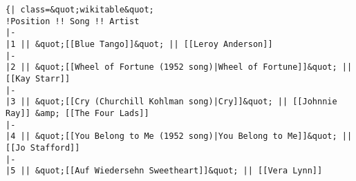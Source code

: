 
\begin{lstlisting}[caption=Auszug eines Wikipedia-Artikel Downloads, label=lst:wikiExcerpt]
{| class=&quot;wikitable&quot;
!Position !! Song !! Artist
|-
|1 || &quot;[[Blue Tango]]&quot; || [[Leroy Anderson]]
|-
|2 || &quot;[[Wheel of Fortune (1952 song)|Wheel of Fortune]]&quot; || [[Kay Starr]]
|-
|3 || &quot;[[Cry (Churchill Kohlman song)|Cry]]&quot; || [[Johnnie Ray]] &amp; [[The Four Lads]]
|-
|4 || &quot;[[You Belong to Me (1952 song)|You Belong to Me]]&quot; || [[Jo Stafford]]
|-
|5 || &quot;[[Auf Wiedersehn Sweetheart]]&quot; || [[Vera Lynn]]
\end{lstlisting}